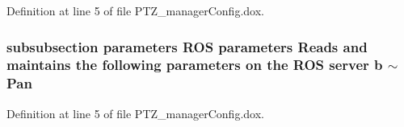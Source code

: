 \-Definition at line 5 of file \-P\-T\-Z\-\_\-manager\-Config.\-dox.

\subsubsection[{$\sim$\-Pan}]{\setlength{\rightskip}{0pt plus 5cm}subsubsection parameters \-R\-O\-S parameters \-Reads and maintains the following parameters on the \-R\-O\-S server b $\sim$\-Pan}\label{PTZ__managerConfig_8dox_a191129bc6d46c1232134ac29e489b974}


\-Definition at line 5 of file \-P\-T\-Z\-\_\-manager\-Config.\-dox.

